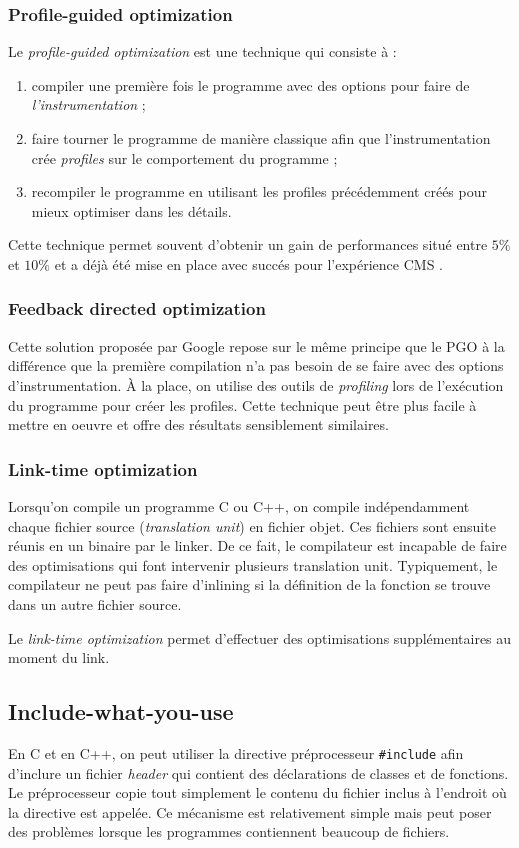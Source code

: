 \documentclass[a4paper]{report}
\begin{document}
\subsubsection{Profile-guided optimization}
Le \emph{profile-guided optimization} est une technique qui consiste à :
\begin{enumerate}
    \item compiler une première fois le programme avec des options pour faire de \emph{l'instrumentation} ;
    \item faire tourner le programme de manière classique afin que l'instrumentation crée \emph{profiles} sur le comportement du programme ;
    \item recompiler le programme en utilisant les profiles précédemment créés pour mieux optimiser dans les détails.
\end{enumerate}
Cette technique permet souvent d'obtenir un gain de performances situé entre $5\%$ et $10\%$ et a déjà été mise en place avec succés pour l'expérience CMS \cite{VIPGOforCMSReco}.

\subsubsection{Feedback directed optimization}
Cette solution proposée par Google \cite{45290} repose sur le même principe que le PGO à la différence que la première compilation n'a pas besoin de se faire avec des options d'instrumentation.
À la place, on utilise des outils de \emph{profiling} lors de l'exécution du programme pour créer les profiles.
Cette technique peut être plus facile à mettre en oeuvre et offre des résultats sensiblement similaires.

\subsubsection{Link-time optimization}
Lorsqu'on compile un programme C ou C++, on compile indépendamment chaque fichier source (\emph{translation unit}) en fichier objet.
Ces fichiers sont ensuite réunis en un binaire par le linker.
De ce fait, le compilateur est incapable de faire des optimisations qui font intervenir plusieurs translation unit.
Typiquement, le compilateur ne peut pas faire d'inlining si la définition de la fonction se trouve dans un autre fichier source.

Le \emph{link-time optimization} permet d'effectuer des optimisations supplémentaires au moment du link.

\subsection{Include-what-you-use}
En C et en C++, on peut utiliser la directive préprocesseur \verb'#include' afin d'inclure un fichier \emph{header} qui contient des déclarations de classes et de fonctions.
Le préprocesseur copie tout simplement le contenu du fichier inclus à l'endroit où la directive est appelée.
Ce mécanisme est relativement simple mais peut poser des problèmes lorsque les programmes contiennent beaucoup de fichiers.
\end{document}
